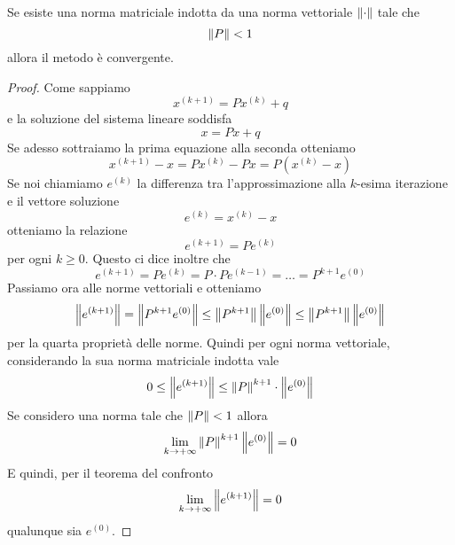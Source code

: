 \begin{theorem}
	Se esiste una norma matriciale indotta da una norma vettoriale $\left\lVert\cdot\right\rVert$ tale che
	\[ \left\lVert P\right\rVert < 1 \]
	allora il metodo è convergente.
	\begin{proof}
		Come sappiamo
		\[ x^{(k+1)} = P x^{(k)} + q \]
		e la soluzione del sistema lineare soddisfa
		\[ x = P x + q \]
		Se adesso sottraiamo la prima equazione alla seconda otteniamo
		\[ x^{(k+1)} - x = P x^{(k)} - P x = P (x^{(k)} - x) \]
		Se noi chiamiamo $e^{(k)}$ la differenza tra l'approssimazione alla $k$-esima iterazione e il vettore
		soluzione
		\[ e^{(k)} = x^{(k)} - x \]
		otteniamo la relazione
		\[ e^{(k+1)} = P e^{(k)} \]
		per ogni $k \geq 0$. Questo ci dice inoltre che
		\[ e^{(k+1)} = P e^{(k)} = P \cdot P e^{(k-1)} = \dots = P^{k+1} e^{(0)} \]
		Passiamo ora alle norme vettoriali e otteniamo
		\[
			\left\lVert e^{(k+1)}\right\rVert = \left\lVert P^{k+1} e^{(0)}\right\rVert \leq
			\left\lVert P^{k+1}\right\rVert \left\lVert e^{(0)}\right\rVert \leq \left\lVert P^{k+1}\right\rVert \left\lVert e^{(0)}\right\rVert
		\]
		per la quarta proprietà delle norme. Quindi per ogni norma vettoriale, considerando la sua norma
		matriciale indotta vale
		\[ 0 \leq \left\lVert e^{(k+1)}\right\rVert \leq \left\lVert P\right\rVert^{k+1} \cdot \left\lVert e^{(0)}\right\rVert \]
		Se considero una norma tale che $\left\lVert P\right\rVert < 1$ allora
		\[ \lim_{k \to +\infty} \left\lVert P\right\rVert^{k+1} \left\lVert e^{(0)}\right\rVert = 0 \]
		E quindi, per il teorema del confronto
		\[ \lim_{k \to +\infty} \left\lVert e^{(k+1)}\right\rVert = 0 \]
		qualunque sia $e^{(0)}$.
	\end{proof}
\end{theorem}

